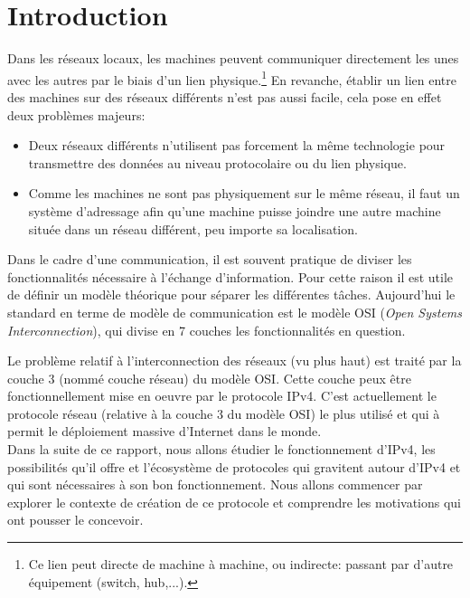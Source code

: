 \section{Introduction}
\label{sec:intro}

Dans les réseaux locaux, les machines peuvent communiquer directement les unes
avec les autres par le biais d'un lien physique.\footnote{Ce lien peut directe
de machine à machine, ou indirecte: passant par d'autre équipement (switch,
hub,...).} En revanche, établir un lien entre des machines sur des réseaux
différents n'est pas aussi facile, cela pose en effet deux problèmes majeurs:
\begin{itemize}
\item Deux réseaux différents n'utilisent pas forcement la même technologie
pour transmettre des données au niveau protocolaire ou du lien physique.
\item Comme les machines ne sont pas physiquement sur le même réseau, il faut
un système d'adressage afin qu'une machine puisse joindre une autre machine
située dans un réseau différent, peu importe sa localisation.
\end{itemize}
Dans le cadre d'une communication, il est souvent pratique de diviser les
fonctionnalités nécessaire à l'échange d'information.  Pour cette raison il est
utile de définir un modèle théorique pour séparer les différentes tâches.
Aujourd'hui le standard en terme de modèle de communication est le modèle OSI
({\it Open Systems Interconnection}), qui divise en 7 couches les
fonctionnalités en question.

\bigskip
Le problème relatif à l'interconnection des réseaux (vu plus haut) est traité
par la couche 3 (nommé couche réseau) du modèle OSI.
Cette couche peux être fonctionnellement mise en oeuvre par le protocole IPv4.
C'est actuellement le protocole réseau (relative à la couche 3 du modèle OSI)
le plus utilisé et qui à permit le déploiement massive d'Internet dans le
monde.\\
Dans la suite de ce rapport, nous allons étudier le fonctionnement d'IPv4, les
possibilités qu'il offre et l'écosystème de protocoles qui gravitent autour
d'IPv4 et qui sont nécessaires à son bon fonctionnement.  Nous allons commencer
par explorer le contexte de création de ce protocole et comprendre les
motivations qui ont pousser le concevoir.


